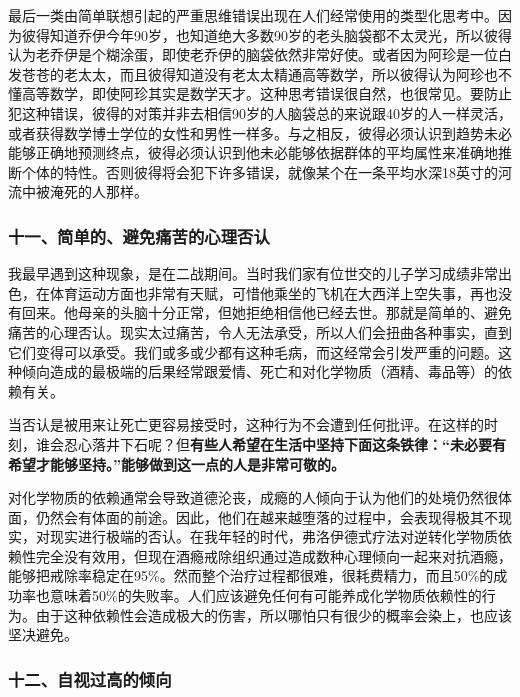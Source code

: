 最后一类由简单联想引起的严重思维错误出现在人们经常使用的类型化思考中。因为彼得知道乔伊今年90岁，也知道绝大多数90岁的老头脑袋都不太灵光，所以彼得认为老乔伊是个糊涂蛋，即使老乔伊的脑袋依然非常好使。或者因为阿珍是一位白发苍苍的老太太，而且彼得知道没有老太太精通高等数学，所以彼得认为阿珍也不懂高等数学，即使阿珍其实是数学天才。这种思考错误很自然，也很常见。要防止犯这种错误，彼得的对策并非去相信90岁的人脑袋总的来说跟40岁的人一样灵活，或者获得数学博士学位的女性和男性一样多。与之相反，彼得必须认识到趋势未必能够正确地预测终点，彼得必须认识到他未必能够依据群体的平均属性来准确地推断个体的特性。否则彼得将会犯下许多错误，就像某个在一条平均水深18英寸的河流中被淹死的人那样。
\par

\subsubsection*{十一、简单的、避免痛苦的心理否认}

我最早遇到这种现象，是在二战期间。当时我们家有位世交的儿子学习成绩非常出色，在体育运动方面也非常有天赋，可惜他乘坐的飞机在大西洋上空失事，再也没有回来。他母亲的头脑十分正常，但她拒绝相信他已经去世。那就是简单的、避免痛苦的心理否认。现实太过痛苦，令人无法承受，所以人们会扭曲各种事实，直到它们变得可以承受。我们或多或少都有这种毛病，而这经常会引发严重的问题。这种倾向造成的最极端的后果经常跟爱情、死亡和对化学物质（酒精、毒品等）的依赖有关。
\par

当否认是被用来让死亡更容易接受时，这种行为不会遭到任何批评。在这样的时刻，谁会忍心落井下石呢？但\textbf{有些人希望在生活中坚持下面这条铁律：“未必要有希望才能够坚持。”能够做到这一点的人是非常可敬的。}
\par

对化学物质的依赖通常会导致道德沦丧，成瘾的人倾向于认为他们的处境仍然很体面，仍然会有体面的前途。因此，他们在越来越堕落的过程中，会表现得极其不现实，对现实进行极端的否认。在我年轻的时代，弗洛伊德式疗法对逆转化学物质依赖性完全没有效用，但现在酒瘾戒除组织通过造成数种心理倾向一起来对抗酒瘾，能够把戒除率稳定在95\%。然而整个治疗过程都很难，很耗费精力，而且50\%的成功率也意味着50\%的失败率。人们应该避免任何有可能养成化学物质依赖性的行为。由于这种依赖性会造成极大的伤害，所以哪怕只有很少的概率会染上，也应该坚决避免。
\par

\subsubsection*{十二、自视过高的倾向}

